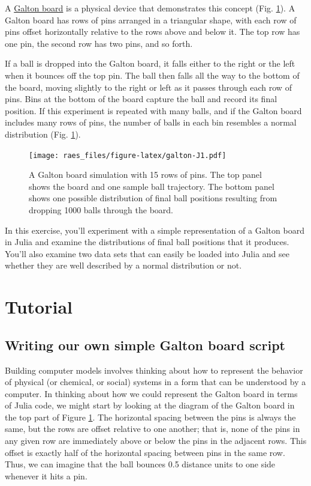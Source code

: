 \documentclass[
  11pt,
]{book}
\begin{document}
A \href{http://mathworld.wolfram.com/GaltonBoard.html}{Galton board} is a physical device that demonstrates this concept (Fig. \ref{fig:galton}). A Galton board has rows of pins arranged in a triangular shape, with each row of pins offset horizontally relative to the rows above and below it. The top row has one pin, the second row has two pins, and so forth.

If a ball is dropped into the Galton board, it falls either to the right or the left when it bounces off the top pin. The ball then falls all the way to the bottom of the board, moving slightly to the right or left as it passes through each row of pins. Bins at the bottom of the board capture the ball and record its final position. If this experiment is repeated with many balls, and if the Galton board includes many rows of pins, the number of balls in each bin resembles a normal distribution (Fig. \ref{fig:galton}).

\begin{figure}
\centering
\texttt{[image: raes\_files/figure-latex/galton-J1.pdf]}
\caption{\label{fig:galton}A Galton board simulation with 15 rows of pins. The top panel shows the board and one sample ball trajectory. The bottom panel shows one possible distribution of final ball positions resulting from dropping 1000 balls through the board.}
\end{figure}

In this exercise, you'll experiment with a simple representation of a Galton board in Julia and examine the distributions of final ball positions that it produces. You'll also examine two data sets that can easily be loaded into Julia and see whether they are well described by a normal distribution or not.

\hypertarget{tutorial-1}{%
\section{Tutorial}\label{tutorial-1}}

\hypertarget{writing-our-own-simple-galton-board-script}{%
\subsection{Writing our own simple Galton board script}\label{writing-our-own-simple-galton-board-script}}

Building computer models involves thinking about how to represent the behavior of physical (or chemical, or social) systems in a form that can be understood by a computer. In thinking about how we could represent the Galton board in terms of Julia code, we might start by looking at the diagram of the Galton board in the top part of Figure \ref{fig:galton}. The horizontal spacing between the pins is always the same, but the rows are offset relative to one another; that is, none of the pins in any given row are immediately above or below the pins in the adjacent rows. This offset is exactly half of the horizontal spacing between pins in the same row. Thus, we can imagine that the ball bounces 0.5 distance units to one side whenever it hits a pin.
\end{document}
